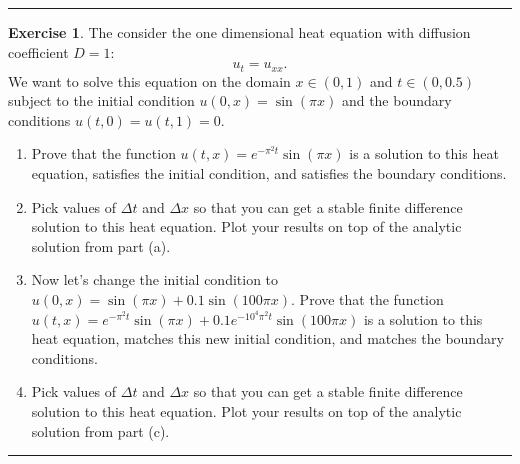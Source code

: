 \documentclass[
]{book}
\providecommand{\tightlist}{%
  \setlength{\itemsep}{0pt}\setlength{\parskip}{0pt}}
\theoremstyle{definition}
\theoremstyle{definition}
\theoremstyle{definition}
\newtheorem{exercise}{Exercise}[chapter]
\theoremstyle{remark}
\begin{document}
\begin{center}\rule{0.5\linewidth}{0.5pt}\end{center}

\begin{exercise}
\protect\hypertarget{exr:unnamed-chunk-553}{}{\label{exr:unnamed-chunk-553} }The consider the one dimensional heat equation with diffusion coefficient \(D=1\):
\[ u_t = u_{xx}. \]
We want to solve this equation on the domain \(x \in (0,1)\) and \(t\in (0,0.5)\) subject to the initial condition \(u(0,x) = \sin(\pi x)\) and the boundary conditions \(u(t,0)=u(t,1) = 0\).

\begin{enumerate}
\def\labelenumi{\alph{enumi}.}
\tightlist
\item
  Prove that the function \(u(t,x) = e^{-\pi^2 t} \sin(\pi x)\) is a solution to this heat equation, satisfies the initial condition, and satisfies the boundary conditions.\\
\item
  Pick values of \(\Delta t\) and \(\Delta x\) so that you can get a stable finite difference solution to this heat equation. Plot your results on top of the analytic solution from part (a).
\item
  Now let's change the initial condition to \(u(0,x)=\sin(\pi x) + 0.1\sin(100 \pi x)\). Prove that the function \(u(t,x) = e^{-\pi^2 t} \sin(\pi x) + 0.1 e^{-10^4\pi^2t}\sin(100\pi x)\) is a solution to this heat equation, matches this new initial condition, and matches the boundary conditions.
\item
  Pick values of \(\Delta t\) and \(\Delta x\) so that you can get a stable finite difference solution to this heat equation. Plot your results on top of the analytic solution from part (c).
\end{enumerate}
\end{exercise}

\begin{center}\rule{0.5\linewidth}{0.5pt}\end{center}
\end{document}
